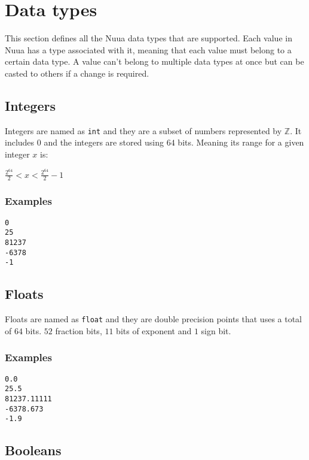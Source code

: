 \section{Data types}

This section defines all the Nuua data types that are supported. Each value in Nuua
has a type associated with it, meaning that each value must belong to a certain data type.
A value can't belong to multiple data types at once but can be casted to others if a change is required.

\subsection{Integers}

Integers are named as \texttt{int} and they are a subset of numbers represented by $\mathbb{Z}$. It includes 0
and the integers are stored using $64$ bits. Meaning its range for a given integer $x$ is:

\begin{center}
$\frac{2^{64}}{2} < x < \frac{2^{64}}{2} - 1$
\end{center}

\subsubsection{Examples}

\begin{lstlisting}
0
25
81237
-6378
-1
\end{lstlisting}

\subsection{Floats}

Floats are named as \texttt{float} and they are double precision points that uses a total of $64$ bits. $52$ fraction bits, $11$ bits
of exponent and $1$ sign bit.

\subsubsection{Examples}

\begin{lstlisting}
0.0
25.5
81237.11111
-6378.673
-1.9
\end{lstlisting}

\subsection{Booleans}

